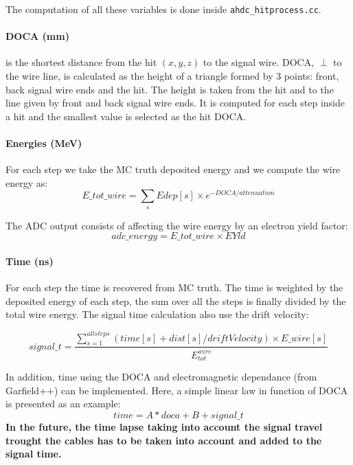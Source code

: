 The computation of all these variables is done inside \texttt{ahdc\_hitprocess.cc}. 

	\paragraph{DOCA (mm)}
	is the shortest distance from the hit $(x,y,z)$ to the signal wire. DOCA, $\perp$ to the wire line, is calculated as the height of a triangle formed by 3 points: front, back signal wire ends and the hit. The height is taken from the hit
and to the line given by front and back signal wire ends. It is computed for each step inside a hit and the smallest value is selected as the hit DOCA.

	\paragraph{Energies (MeV)}
	For each step we take the MC truth deposited energy and we compute the wire energy as:
	\begin{equation}
	E\_tot\_wire = \sum_{s} Edep[s] \times e^{-DOCA/attenuation}
	\end{equation}
	
	The ADC output consists of affecting the wire energy by an electron yield factor:
	\begin{equation}
	adc\_energy = E\_tot\_wire \times EYld
	\end{equation}
	
	\paragraph{Time (ns)}
	For each step the time is recovered from MC truth. The time is weighted by the deposited energy of each step, the sum over all the steps is finally divided by the total wire energy. The signal time calculation also use the drift velocity:
  	\begin{center}
	\begin{equation}
	signal\_t = \frac{\sum_{s=1}^{all steps} (time[s] + dist[s]/driftVelocity) \times E\_wire[s]}{E_{tot}^{wire}}
	\end{equation}
	\end{center}
	
	In addition, time using the DOCA and electromagnetic dependance (from Garfield++) can be implemented. Here, a simple linear law in function of DOCA is presented as an example:
	\begin{equation}
	time = A*doca+B + signal\_t
	\end{equation}
	\textbf{In the future, the time lapse taking into account the signal travel trought the cables has to be taken into account and added to the signal time.}
	
